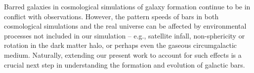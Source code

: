 \documentclass{natureprintstyle}
\begin{document}
Barred galaxies in cosmological simulations of galaxy formation continue to be
in conflict with observations.\cite{2017MNRAS.469.1054A, 2019MNRAS.483.2721P,
2021AA...650L..16F} However, the pattern speeds of bars in both cosmological
simulations and the real universe can be affected by environmental processes
not included in our simulation -- e.g., satellite
infall\cite{2011Natur.477..301P}, non-sphericity\cite{2013MNRAS.429.1949A} or
rotation\cite{2013MNRAS.434.1287S, 2014ApJ...783L..18L, 2018MNRAS.476.1331C,
2019MNRAS.488.5788C} in the dark matter halo, or perhaps even the gaseous
circumgalactic medium. Naturally, extending our present work to account for
such effects is a crucial next step in understanding the formation and
evolution of galactic bars.



\end{document}
